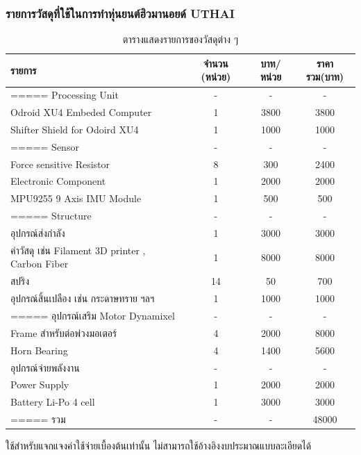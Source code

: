 \subsubsection{รายการวัสดุที่ใช้ในการทำหุ่นยนต์ฮิวมานอยด์ UTHAI}
\begin{table}[ht]
	\centering
	\begin{tabular}{| l | c | c | c|}
		\hline
		รายการ & จำนวน (หน่วย) & บาท/หน่วย & ราคารวม(บาท) \\
		\hline
		===== Processing Unit & - & - & -\\
		Odroid XU4 Embeded Computer & 1 & 3800 & 3800\\
		Shifter Shield for Odoird XU4 & 1 & 1000 & 1000\\
		===== Sensor & - & - & -\\
		Force sensitive Resistor & 8 & 300 & 2400\\
		Electronic Component & 1 & 2000 & 2000\\
		MPU9255 9 Axis IMU Module & 1 & 500 & 500\\
		===== Structure & - & - & -\\
		อุปกรณ์ส่งกำลัง & 1 & 3000 & 3000\\
		ค่าวัสดุ เช่น Filament 3D printer , Carbon Fiber & 1 & 8000 & 8000\\
		สปริง & 14 & 50 & 700\\
		อุปกรณ์สิ้นเปลือง เช่น กระดาษทราย ฯลฯ & 1 & 1000 & 1000\\
		===== อุปกรณ์เสริม Motor Dynamixel & - & - & -\\
		Frame สำหรับต่อพ่วงมอเตอร์ & 4 & 2000 & 8000\\
		Horn Bearing & 4 & 1400 & 5600\\
		อุปกรณ์จ่ายพลังงาน & - & - & -\\
		Power Supply & 1 & 2000 & 2000\\
		Battery Li-Po 4 cell & 1 & 3000 & 3000\\
		===== รวม & - & - & 48000\\
		\hline
	\end{tabular}
	\caption{ตารางแสดงรายการของวัสดุต่าง ๆ}
	\label{tab:matrial_buyer}
\end{table}
ใช้สำหรับแจกแจงค่าใช้จ่ายเบื้องต้นเท่านั้น ไม่สามารถใช้อ้างอิงงบประมาณแบบละเอียดได้

